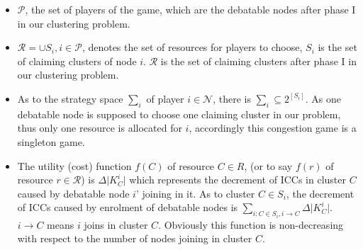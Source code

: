 
\begin{itemize}
	\item $\mathcal{P}$, the set of players of the game, which are the debatable nodes after phase I in our clustering problem.
	\item $\mathcal{R} = \cup S_i, i\in \mathcal{P}$, denotes the set of resources for players to choose, $S_i$ is the set of claiming clusters of node $i$. $\mathcal{R}$ is the set of claiming clusters after phase I in our clustering problem.
	\item As to the strategy space $\sum_i$ of player $i\in \mathcal{N}$, there is $\sum_i \subseteq 2^{\left[S_i\right]}$. As one debatable node is supposed to choose one claiming cluster in our problem, thus only one resource is allocated for $i$, accordingly this congestion game is a singleton game.
	
	
	\item %
	The utility (cost) function $f(C)$ of resource $C\in R$, (or to say $f(r)$ of resource $r \in \mathcal{R}$) is $\Delta\vert K^i_C \vert$ which represents the decrement of ICCs in cluster $C$ caused by debatable node $i$' joining in it.
	As to cluster $C\in S_i$, the decrement of ICCs caused by enrolment of debatable nodes is $\sum_{i:C\in S_i, i\rightarrow C} \Delta\vert K^i_C \vert$. 
$i\rightarrow C$ means $i$ joins in cluster $C$.
Obviously this function is non-decreasing with respect to the number of nodes joining in cluster $C$.
	

\end{itemize}
